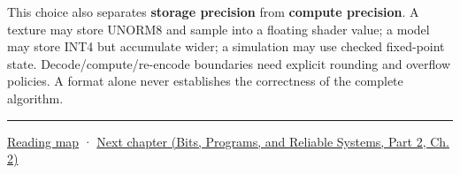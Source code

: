 This choice also separates \textbf{storage precision} from \textbf{compute precision}. A texture may store UNORM8 and sample into a floating shader value; a model may store INT4 but accumulate wider; a simulation may use checked fixed-point state. Decode/compute/re-encode boundaries need explicit rounding and overflow policies. A format alone never establishes the correctness of the complete algorithm.

\begin{center}\rule{0.5\linewidth}{0.5pt}\end{center}

\hyperref[volume-reading-map]{Reading map} · \href{../01-Bits-Programs-and-Reliable-Systems-P02/main.pdf\#01-foundations-i-ch002-values-at-addresses-layout-lifetimes-and-representation}{Next chapter (Bits, Programs, and Reliable Systems, Part 2, Ch. 2)}
